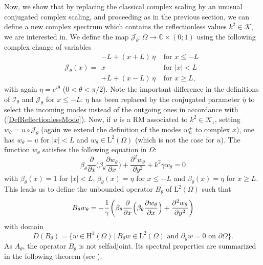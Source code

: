 \documentclass[11pt,a4paper]{report}
\newcommand{\Om}{\Omega}
\newcommand{\mrm}[1]{\mathrm{#1}}
\newcommand{\Cplx}{\mathbb{C}}
\newcommand{\mL}{\mrm{L}}
\newcommand{\mH}{\mrm{H}}
\begin{document}
Now, we show that by replacing the classical complex scaling by an unusual conjugated complex scaling, and proceeding  as in the previous section, we can define a new complex spectrum which contains the reflectionless values  $k^2\in \mathscr{K}_{\mrm{r}}$ we are interested in. We define the map $\mathcal{J}_{\theta}:\Om\to\Cplx\times(0;1)$ using the following  complex change of variables  
\begin{equation}\label{defDilatationConjugated}
\mathcal{J}_{\theta}(x)=\begin{array}{|ll}
-L+(x+L)\,\overline{\eta}&\mbox{ for }x\le- L\\
x&\mbox{ for }|x|< L\\
+ L+(x-L)\,\eta&\mbox{ for } x\ge L,
\end{array}
\end{equation}
with again $\eta=e^{i\theta}$ ($0<\theta<\pi/2$). Note the important difference in the definitions of $\mathcal{I}_{\theta}$ and $\mathcal{J}_{\theta}$ for $x\le-L$: $\eta$ has been replaced by the conjugated parameter $\overline{\eta}$ to select the incoming modes instead of the outgoing ones in accordance with (\ref{DefReflectionlessMode}). Now, if $u$ is a RM associated to  $k^2\in \mathscr{K}_{\mrm{r}}$, setting  $w_{\theta}=u\circ \mathcal{J}_{\theta}$ (again we extend the definition of the modes $w_n^\pm$ to complex $x$), one has $w_{\theta}=u$ for $|x|< L$ and $w_{\theta}\in \mL^2(\Omega)$ (which is not the case for $u$). The function $w_{\theta}$ satisfies the following equation in $\Om$:
\begin{equation}\label{DefPbFortCPMLs}
\beta_{\theta}\frac{\partial}{\partial x}\Big(\beta_{\theta}\frac{\partial w_{\theta}}{\partial x}\Big)+\frac{\partial^2 w_{\theta}}{\partial y^2}+k^2\gamma w_{\theta}=0
\end{equation}
with $\beta_{\theta}(x)=1$ for $|x|< L$, $\beta_{\theta}(x)=\eta$ for $x\le-L$ and $\beta_{\theta}(x)=\overline{\eta}$ for $x\ge L$. This leads us to define the unbounded operator $B_{\theta}$ of $\mL^2(\Om)$ such that
\begin{equation}\label{defOpConjugatedPMLs}
B_{\theta}w_{\theta}=-\cfrac{1}{\gamma}\left(\beta_{\theta}\frac{\partial}{\partial x}\Big(\beta_{\theta}\frac{\partial w_{\theta}}{\partial x}\Big)+\frac{\partial^2 w_{\theta}}{\partial y^2}\right)
\end{equation}
with domain 
\[
D(B_{\theta})=\{w\in\mH^1(\Om)\,|\,B_{\theta}w\in \mL^2(\Om)\mbox{ and }\partial_{y}w=0\mbox{ on }\partial\Om\}.
\]
As $A_{\theta}$, the operator $B_{\theta}$ is not selfadjoint. Its spectral properties are summarized in the following theorem (see \cite[Thm.\,4.1]{BoCP18}). 
\end{document}

